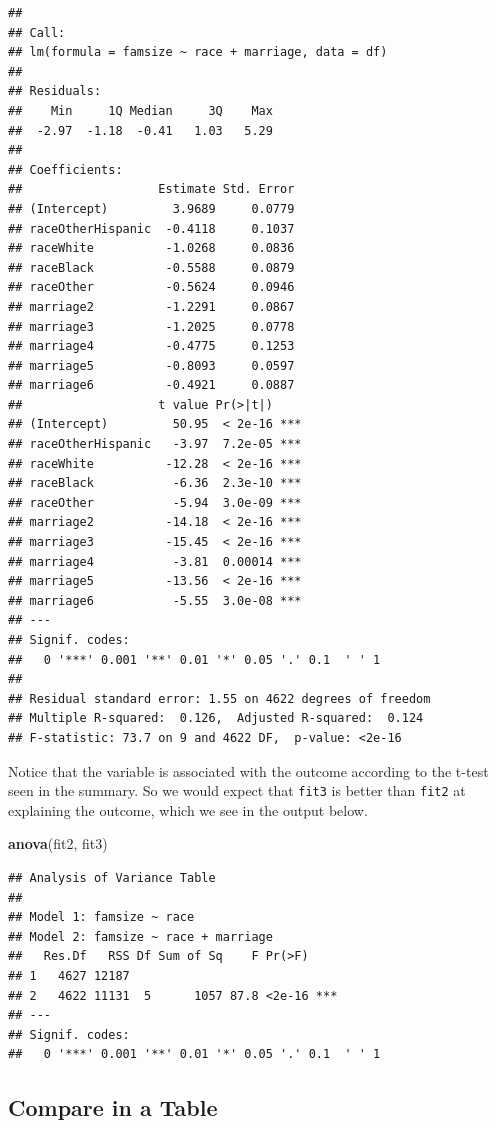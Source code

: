 \documentclass[]{tufte-book}
\newenvironment{Shaded}{}{}
\newcommand{\KeywordTok}[1]{\textcolor[rgb]{0.00,0.44,0.13}{\textbf{#1}}}
\newcommand{\NormalTok}[1]{#1}
\theoremstyle{definition}
\theoremstyle{definition}
\theoremstyle{remark}
\begin{document}
\begin{verbatim}
## 
## Call:
## lm(formula = famsize ~ race + marriage, data = df)
## 
## Residuals:
##    Min     1Q Median     3Q    Max 
##  -2.97  -1.18  -0.41   1.03   5.29 
## 
## Coefficients:
##                   Estimate Std. Error
## (Intercept)         3.9689     0.0779
## raceOtherHispanic  -0.4118     0.1037
## raceWhite          -1.0268     0.0836
## raceBlack          -0.5588     0.0879
## raceOther          -0.5624     0.0946
## marriage2          -1.2291     0.0867
## marriage3          -1.2025     0.0778
## marriage4          -0.4775     0.1253
## marriage5          -0.8093     0.0597
## marriage6          -0.4921     0.0887
##                   t value Pr(>|t|)    
## (Intercept)         50.95  < 2e-16 ***
## raceOtherHispanic   -3.97  7.2e-05 ***
## raceWhite          -12.28  < 2e-16 ***
## raceBlack           -6.36  2.3e-10 ***
## raceOther           -5.94  3.0e-09 ***
## marriage2          -14.18  < 2e-16 ***
## marriage3          -15.45  < 2e-16 ***
## marriage4           -3.81  0.00014 ***
## marriage5          -13.56  < 2e-16 ***
## marriage6           -5.55  3.0e-08 ***
## ---
## Signif. codes:  
##   0 '***' 0.001 '**' 0.01 '*' 0.05 '.' 0.1  ' ' 1
## 
## Residual standard error: 1.55 on 4622 degrees of freedom
## Multiple R-squared:  0.126,  Adjusted R-squared:  0.124 
## F-statistic: 73.7 on 9 and 4622 DF,  p-value: <2e-16
\end{verbatim}

Notice that the variable is associated with the outcome according to the
t-test seen in the summary. So we would expect that \texttt{fit3} is
better than \texttt{fit2} at explaining the outcome, which we see in the
output below.

\begin{Shaded}
\begin{Highlighting}[]
\KeywordTok{anova}\NormalTok{(fit2, fit3)}
\end{Highlighting}
\end{Shaded}

\begin{verbatim}
## Analysis of Variance Table
## 
## Model 1: famsize ~ race
## Model 2: famsize ~ race + marriage
##   Res.Df   RSS Df Sum of Sq    F Pr(>F)    
## 1   4627 12187                             
## 2   4622 11131  5      1057 87.8 <2e-16 ***
## ---
## Signif. codes:  
##   0 '***' 0.001 '**' 0.01 '*' 0.05 '.' 0.1  ' ' 1
\end{verbatim}

\subsection*{Compare in a Table}\label{compare-in-a-table}
\end{document}
